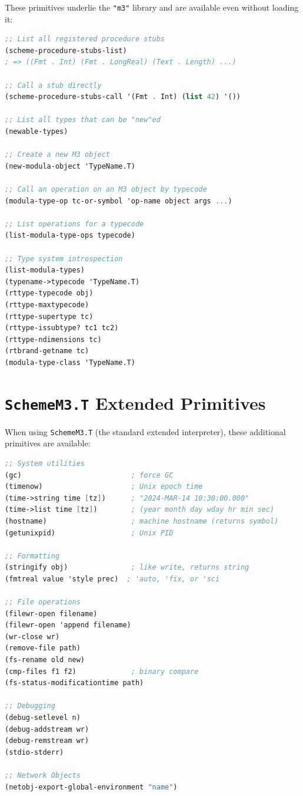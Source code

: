 \documentclass[12pt]{report}
\begin{document}
These primitives underlie the {\tt "m3"} library and are available
even without loading it:

\begin{lstlisting}[language=Scheme]
;; List all registered procedure stubs
(scheme-procedure-stubs-list)
; => ((Fmt . Int) (Fmt . LongReal) (Text . Length) ...)

;; Call a stub directly
(scheme-procedure-stubs-call '(Fmt . Int) (list 42) '())

;; List all types that can be "new"ed
(newable-types)

;; Create a new M3 object
(new-modula-object 'TypeName.T)

;; Call an operation on an M3 object by typecode
(modula-type-op tc-or-symbol 'op-name object args ...)

;; List operations for a typecode
(list-modula-type-ops typecode)

;; Type system introspection
(list-modula-types)
(typename->typecode 'TypeName.T)
(rttype-typecode obj)
(rttype-maxtypecode)
(rttype-supertype tc)
(rttype-issubtype? tc1 tc2)
(rttype-ndimensions tc)
(rtbrand-getname tc)
(modula-type-class 'TypeName.T)
\end{lstlisting}

\section{{\tt SchemeM3.T} Extended Primitives}

When using {\tt SchemeM3.T} (the standard extended interpreter), these
additional primitives are available:

\begin{lstlisting}[language=Scheme]
;; System utilities
(gc)                          ; force GC
(timenow)                     ; Unix epoch time
(time->string time [tz])      ; "2024-MAR-14 10:30:00.000"
(time->list time [tz])        ; (year month day wday hr min sec)
(hostname)                    ; machine hostname (returns symbol)
(getunixpid)                  ; Unix PID

;; Formatting
(stringify obj)               ; like write, returns string
(fmtreal value 'style prec)  ; 'auto, 'fix, or 'sci

;; File operations
(filewr-open filename)
(filewr-open 'append filename)
(wr-close wr)
(remove-file path)
(fs-rename old new)
(cmp-files f1 f2)             ; binary compare
(fs-status-modificationtime path)

;; Debugging
(debug-setlevel n)
(debug-addstream wr)
(debug-remstream wr)
(stdio-stderr)

;; Network Objects
(netobj-export-global-environment "name")
\end{lstlisting}
\end{document}
